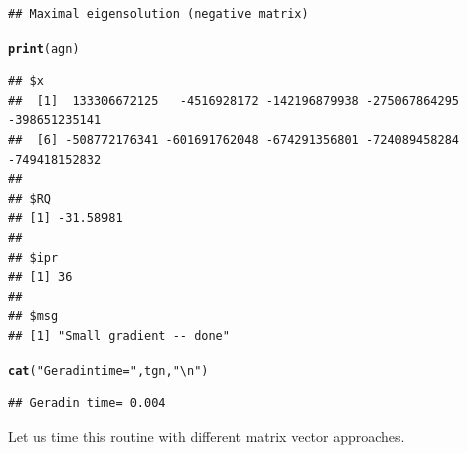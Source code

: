 \documentclass[10pt]{article}\usepackage[]{graphicx}\usepackage[]{color}
\makeatletter
\newcommand{\hlstr}[1]{\textcolor[rgb]{0.192,0.494,0.8}{#1}}%
\newcommand{\hlstd}[1]{\textcolor[rgb]{0.345,0.345,0.345}{#1}}%
\newcommand{\hlkwd}[1]{\textcolor[rgb]{0.737,0.353,0.396}{\textbf{#1}}}%
\newenvironment{kframe}{%
 \def\at@end@of@kframe{}%
 \ifinner\ifhmode%
  \def\at@end@of@kframe{\end{minipage}}%
  \begin{minipage}{\columnwidth}%
 \fi\fi%
 \def\FrameCommand##1{\hskip\@totalleftmargin \hskip-\fboxsep
 \colorbox{shadecolor}{##1}\hskip-\fboxsep
     \hskip-\linewidth \hskip-\@totalleftmargin \hskip\columnwidth}%
 \MakeFramed {\advance\hsize-\width
   \@totalleftmargin\z@ \linewidth\hsize
   \@setminipage}}%
 {\par\unskip\endMakeFramed%
 \at@end@of@kframe}
\newenvironment{knitrout}{}{} %
\makeatother
\begin{document}
\begin{knitrout}
\begin{kframe}
\begin{verbatim}
## Maximal eigensolution (negative matrix)
\end{verbatim}
\begin{alltt}
\hlkwd{print}\hlstd{(agn)}
\end{alltt}
\begin{verbatim}
## $x
##  [1]  133306672125   -4516928172 -142196879938 -275067864295 -398651235141
##  [6] -508772176341 -601691762048 -674291356801 -724089458284 -749418152832
## 
## $RQ
## [1] -31.58981
## 
## $ipr
## [1] 36
## 
## $msg
## [1] "Small gradient -- done"
\end{verbatim}
\begin{alltt}
\hlkwd{cat}\hlstd{(}\hlstr{"Geradin time="}\hlstd{,tgn,}\hlstr{"\textbackslash{}n"}\hlstd{)}
\end{alltt}
\begin{verbatim}
## Geradin time= 0.004
\end{verbatim}
\end{kframe}
\end{knitrout}

Let us time this routine with different matrix vector approaches.
\end{document}
